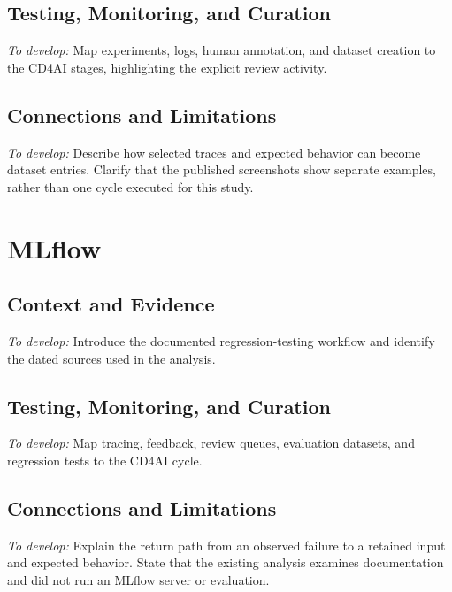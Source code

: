 \subsection{Testing, Monitoring, and Curation}
\noindent\emph{To develop:} Map experiments, logs, human annotation, and dataset
creation to the CD4AI stages, highlighting the explicit review activity.

\subsection{Connections and Limitations}
\noindent\emph{To develop:} Describe how selected traces and expected behavior
can become dataset entries. Clarify that the published screenshots show
separate examples, rather than one cycle executed for this study.

\section{MLflow}
\label{sec:case-mlflow}

\subsection{Context and Evidence}
\noindent\emph{To develop:} Introduce the documented regression-testing workflow
and identify the dated sources used in the analysis.

\subsection{Testing, Monitoring, and Curation}
\noindent\emph{To develop:} Map tracing, feedback, review queues, evaluation
datasets, and regression tests to the CD4AI cycle.

\subsection{Connections and Limitations}
\noindent\emph{To develop:} Explain the return path from an observed failure to
a retained input and expected behavior. State that the existing analysis
examines documentation and did not run an MLflow server or evaluation.

